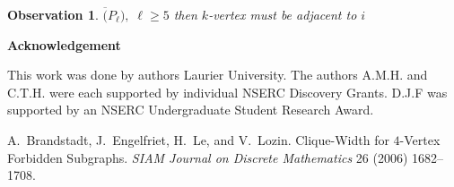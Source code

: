 \documentclass[12pt]{article}
\newtheorem{Observation}[Theorem]{Observation}
\begin{document}
\begin{Observation}\label{obs:copl-pattern}
$\overline(P_\ell),\; \ell \geq 5$ then $k$-vertex must be adjacent to $i$
\end{Observation}


\begin{center}
{\bf Acknowledgement}
\end{center}
This work was done by authors  Laurier University. The authors A.M.H. and C.T.H. were each supported by individual NSERC Discovery Grants. D.J.F was supported by an NSERC Undergraduate Student Research Award.


\clearpage
\begin{thebibliography}{99}


    A.~Brandstadt, J.~Engelfriet, H.~Le, and V.~Lozin. Clique-Width for $4$-Vertex Forbidden Subgraphs.  {\sl SIAM
     Journal on Discrete Mathematics} 26 (2006) 1682--1708.

\end{thebibliography}
\end{document}

